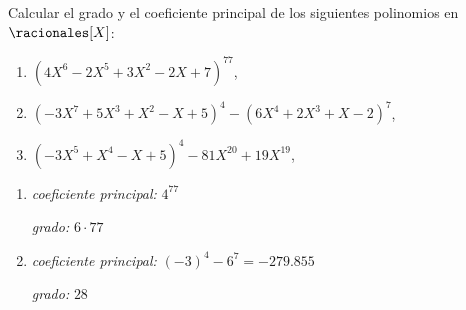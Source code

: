\begin{enunciado}{\ejercicio}
  Calcular el grado y el coeficiente principal de los siguientes polinomios en $\racionales[X]$:
  \begin{enumerate}[label=\roman*)]
    \item $(4X^6 - 2X^5 + 3X^2 - 2X + 7)^{77}$,
    \item $(-3X^7 + 5X^3 + X^2 - X + 5)^4 - (6X^4 + 2X^3 + X - 2)^7$,
    \item $(-3X^5 + X^4 - X + 5)^4 - 81X^{20} + 19X^{19}$,
  \end{enumerate}

\end{enunciado}

\begin{enumerate}[label=\roman*)]
  \item \textit{coeficiente principal: } $4^{77}$\par
        \textit{grado: } $6\cdot 77$\par

  \item \textit{coeficiente principal: } $(-3)^4 - 6^7 = -279.855$\par
        \textit{grado: } $28$\par


\end{enumerate}
